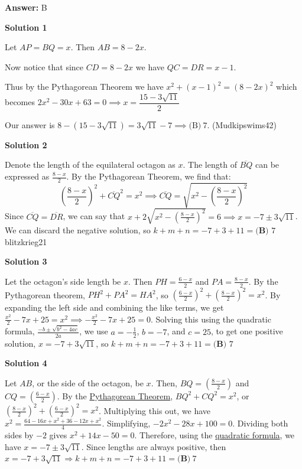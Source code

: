 \begin{enumerate}
 \textbf{Answer: }B



\textbf{Solution 1}

Let $AP=BQ=x$. Then $AB=8-2x$.

 Now notice that since $CD=8-2x$ we have $QC=DR=x-1$.

 Thus by the Pythagorean Theorem we have $x^2+(x-1)^2=(8-2x)^2$ which becomes $2x^2-30x+63=0\implies x=\dfrac{15-3\sqrt{11}}{2}$

 Our answer is $8-(15-3\sqrt{11})=3\sqrt{11}-7\implies \boxed{\text{(B)}~7}$. (Mudkipswims42)

 



\textbf{Solution 2}

Denote the length of the equilateral octagon as $x$. The length of $\overline{BQ}$ can be expressed as $\frac{8-x}{2}$. By the Pythagorean Theorem, we find that:
 \[\left(\frac{8-x}{2}\right)^2+\overline{CQ}^2=x^2\implies \overline{CQ}=\sqrt{x^2-\left(\frac{8-x}{2}\right)^2}\] Since $\overline{CQ}=\overline{DR}$, we can say that $x+2\sqrt{x^2-\left(\frac{8-x}{2}\right)^2}=6\implies x=-7\pm3\sqrt{11}$. We can discard the negative solution, so $k+m+n=-7+3+11=\boxed{\textbf{(B) }7}$ ~ blitzkrieg21

 



\textbf{Solution 3}

Let the octagon's side length be $x$. Then $PH = \frac{6 - x}{2}$ and $PA = \frac{8 - x}{2}$. By the Pythagorean theorem, $PH^2 + PA^2 = HA^2$, so $\left(\frac{6 - x}{2} \right)^2 + \left(\frac{8 - x}{2} \right)^2 = x^2$. By expanding the left side and  combining the like terms, we get $\frac{x^2}{2} - 7x + 25 = x^2 \implies -\frac{x^2}{2} - 7x + 25 = 0$. Solving this using the quadratic formula, $\frac{-b \pm \sqrt{b^2-4ac}}{2a}$, we use $a = -\frac{1}{2}$, $b = -7$, and $c = 25$, to get one positive solution, $x=-7+3\sqrt{11}$, so $k+m+n=-7+3+11=\boxed{\textbf{(B) }7}$




\textbf{Solution 4}

Let $AB$, or the side of the octagon, be $x$. Then, $BQ = \left(\frac{8-x}{2}\right)$ and $CQ = \left(\frac{6-x}{2}\right)$. By the \href{https://artofproblemsolving.com/wiki/index.php?title=Pythagorean\_Theorem}{Pythagorean Theorem}, $BQ^2+CQ^2=x^2$, or $\left(\frac{8-x}{2}\right)^2+\left(\frac{6-x}{2}\right)^2 = x^2$. Multiplying this out, we have $x^2 = \frac{64-16x+x^2+36-12x+x^2}{4}$. Simplifying, $-2x^2-28x+100=0$. Dividing both sides by $-2$ gives $x^2+14x-50=0$. Therefore, using the \href{https://artofproblemsolving.com/wiki/index.php?title=Quadratic\_formula}{quadratic formula}, we have $x=-7 \pm 3\sqrt{11}$. Since lengths are always positive, then $x=-7+3\sqrt{11} \Rightarrow k+m+n=-7+3+11=\boxed{\textbf{(B)}\ 7}$




\end{enumerate}
